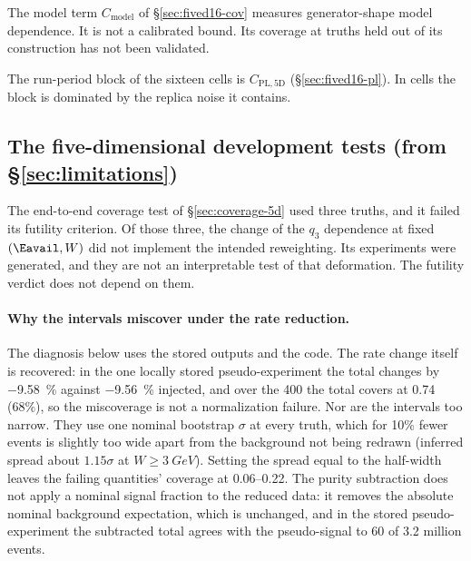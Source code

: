 The model term $C_{\mathrm{model}}$ of \S\ref{sec:fived16-cov} measures generator-shape model dependence. It is not a calibrated bound. Its coverage at truths held out of its construction has not been validated.

The run-period block of the sixteen cells is $C_{\mathrm{PL,5D}}$ (\S\ref{sec:fived16-pl}). In cells  the block is dominated by the replica noise it contains.

\subsection{The five-dimensional development tests (from \S\ref{sec:limitations})}\label{rlim:5d}
The end-to-end coverage test of \S\ref{sec:coverage-5d} used three truths, and it failed its futility criterion. Of those three, the change of the $q_3$ dependence at fixed $(\Eavail,W)$ did not implement the intended reweighting. Its experiments were generated, and they are not an interpretable test of that deformation. The futility verdict does not depend on them.

\paragraph{Why the intervals miscover under the rate reduction.} The diagnosis below uses the stored outputs and the code.  The rate change itself is recovered: in the one locally stored pseudo-experiment the total changes by \SI{-9.58}{\percent} against \SI{-9.56}{\percent} injected, and over the 400 the total covers at 0.74 (68\%), so the miscoverage is not a normalization failure.  Nor are the intervals too narrow. They use one nominal bootstrap $\sigma$ at every truth, which for 10\% fewer events is slightly too wide apart from the background not being redrawn (inferred spread about $1.15\sigma$ at $W\ge\SI{3}{GeV}$). Setting the spread equal to the half-width leaves the failing quantities' coverage at 0.06--0.22.  The purity subtraction does not apply a nominal signal fraction to the reduced data: it removes the absolute nominal background expectation, which is unchanged, and in the stored pseudo-experiment the subtracted total agrees with the pseudo-signal to 60 of 3.2 million events.

